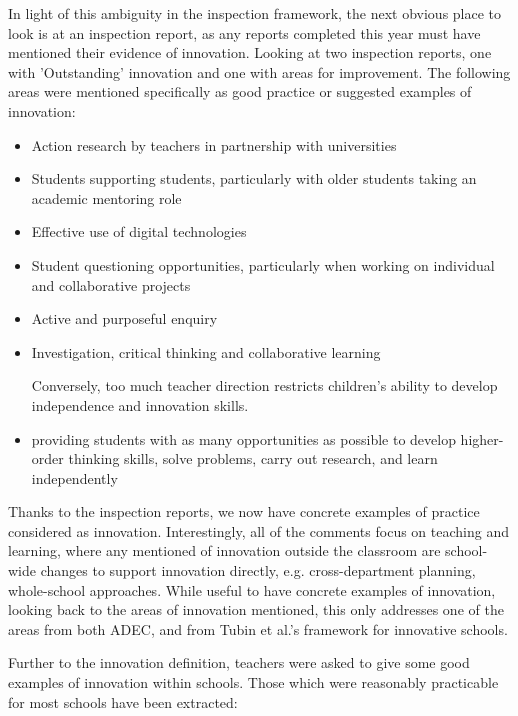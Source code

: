 In light of this ambiguity in the inspection framework, the next obvious place to look is at an inspection report, as any reports completed this year must have mentioned their evidence of innovation. Looking at two inspection reports, one with 'Outstanding' innovation and one with areas for improvement. The following areas were mentioned specifically as good practice or suggested examples of innovation:
\begin{itemize}
\item Action research by teachers in partnership with universities
\item Students supporting students, particularly with older students taking an academic mentoring role
\item Effective use of digital technologies
\item Student questioning opportunities, particularly when working on individual and collaborative projects
\item Active and purposeful enquiry 
\item Investigation, critical thinking and collaborative learning
\item [Conversely,] too much teacher direction restricts children’s ability to develop independence and innovation skills.
\item providing students with as many opportunities as possible to develop higher-order thinking skills, solve problems, carry out research, and learn independently
\end{itemize}

Thanks to the inspection reports, we now have concrete examples of practice considered as innovation. Interestingly, all of the comments focus on teaching and learning, where any mentioned of innovation outside the classroom are school-wide changes to support innovation directly, e.g. cross-department planning, whole-school approaches. While useful to have concrete examples of innovation, looking back to the areas of innovation mentioned, this only addresses one of the areas from both ADEC, and from Tubin et al.'s framework for innovative schools.

Further to the innovation definition, teachers were asked to give some good examples of innovation within schools. Those which were reasonably practicable for most schools have been extracted: 

